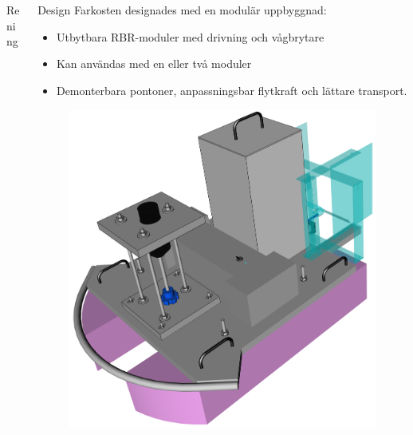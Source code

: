 \documentclass[final]{beamer}
\newlength{\onecolwid}
\begin{document}
\begin{frame}[t]
\begin{columns}[t, totalwidth=\textwidth]
\begin{column}{\onecolwid}
\begin{block}{Rening}
      \end{block}

    \end{column}

    \begin{column}{\onecolwid}

      \begin{block}{Design}
        Farkosten designades med en modulär uppbyggnad:
          \begin{itemize}
          \item Utbytbara RBR-moduler med drivning och vågbrytare
          \item Kan användas med en eller två moduler
          \item Demonterbara pontoner, anpassningsbar flytkraft och lättare transport.
          \end{itemize}

        \vskip 5cm
        \begin{figure}[H]
          \centering
          \hbox{\hspace{-5cm}\includegraphics[width=27cm]{figures/front_box_off.png}}
        \end{figure}

      \end{block}


\end{column}
\end{columns}
\end{frame}
\end{document}
